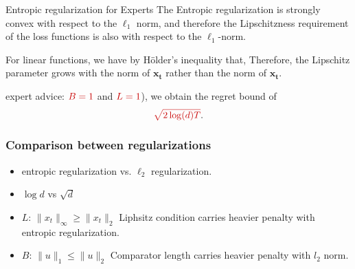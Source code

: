 \documentclass[handout]{beamer}
\newcommand{\redmath}[1]{\textcolor{mathred}{#1}}
\begin{document}
\begin{frame}{Entropic regularization for Experts}
    The Entropic regularization is strongly convex with respect to the \( \ell_1 \) norm, and therefore the Lipschitzness requirement of the loss functions is also with respect to the \( \ell_1 \)-norm. 
    
    For linear functions, 
    \R{\[
    f_t(\mathbf{w}) = \langle \mathbf{w}, \mathbf{x_t} \rangle,
    \]}
    we have by Hölder’s inequality that,
    \R{\[
    | f_t(\mathbf{w}) - f_t(\mathbf{u}) | = | \langle \mathbf{w} - \mathbf{u}, \mathbf{x_t} \rangle | 
    \leq \| \mathbf{w} - \mathbf{u} \|_1 \|\mathbf{x_t} \|_\infty.
    \]}
    Therefore, the Lipschitz parameter grows with the \R{\( \ell_\infty \)} norm of \( \mathbf{x_t} \) rather than the  norm of \( \mathbf{x_t} \). 
    
    expert advice: \( \redmath{B = 1} \) and \( \redmath{L = 1} \)), we obtain the regret bound of 
    \[
    \redmath{\sqrt{2\log(d)T}}.
    \]
\end{frame}

\begin{frame}
  \frametitle{Comparison between regularizations}
  \begin{itemize}
  \item entropic regularization vs. $\ell_2$ regularization.
  \item $\log {d}$ vs $\sqrt{d}$
  \item $L$: $\|x_t\|_{\infty} \geq \|x_t\|_{2}$ Liphsitz condition carries heavier penalty with entropic regularization.
  \item $B$: $\|u\|_1 \leq \|u\|_{2}$ Comparator length carries heavier penalty with $l_2$ norm.
  \end{itemize}
\end{frame}
\end{document}
